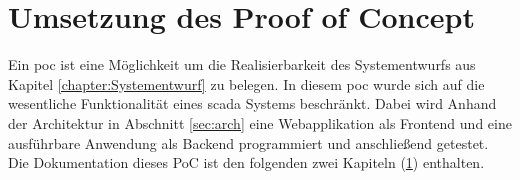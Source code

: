 \chapter{Umsetzung des Proof of Concept}
Ein \ac{poc} ist eine Möglichkeit um die Realisierbarkeit des Systementwurfs aus Kapitel \ref{chapter:Systementwurf} zu belegen.
In diesem  \ac{poc} wurde sich auf die wesentliche Funktionalität eines \ac{scada} Systems beschränkt.
Dabei wird Anhand der Architektur in Abschnitt \ref{sec:arch} eine Webapplikation als Frontend und eine ausführbare Anwendung als Backend programmiert und anschließend getestet.
Die Dokumentation dieses PoC ist den folgenden zwei Kapiteln (\ref{}) enthalten.


